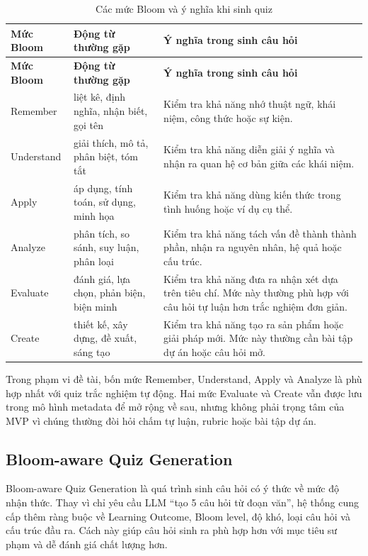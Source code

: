 \begin{longtable}{|p{2.6cm}|p{4.2cm}|p{7cm}|}
\caption{Các mức Bloom và ý nghĩa khi sinh quiz}
\label{tab:bloom-levels}\\
\hline
\textbf{Mức Bloom} & \textbf{Động từ thường gặp} & \textbf{Ý nghĩa trong sinh câu hỏi} \\
\hline
\endfirsthead
\hline
\textbf{Mức Bloom} & \textbf{Động từ thường gặp} & \textbf{Ý nghĩa trong sinh câu hỏi} \\
\hline
\endhead
Remember & liệt kê, định nghĩa, nhận biết, gọi tên & Kiểm tra khả năng nhớ thuật ngữ, khái niệm, công thức hoặc sự kiện. \\
\hline
Understand & giải thích, mô tả, phân biệt, tóm tắt & Kiểm tra khả năng diễn giải ý nghĩa và nhận ra quan hệ cơ bản giữa các khái niệm. \\
\hline
Apply & áp dụng, tính toán, sử dụng, minh họa & Kiểm tra khả năng dùng kiến thức trong tình huống hoặc ví dụ cụ thể. \\
\hline
Analyze & phân tích, so sánh, suy luận, phân loại & Kiểm tra khả năng tách vấn đề thành thành phần, nhận ra nguyên nhân, hệ quả hoặc cấu trúc. \\
\hline
Evaluate & đánh giá, lựa chọn, phản biện, biện minh & Kiểm tra khả năng đưa ra nhận xét dựa trên tiêu chí. Mức này thường phù hợp với câu hỏi tự luận hơn trắc nghiệm đơn giản. \\
\hline
Create & thiết kế, xây dựng, đề xuất, sáng tạo & Kiểm tra khả năng tạo ra sản phẩm hoặc giải pháp mới. Mức này thường cần bài tập dự án hoặc câu hỏi mở. \\
\hline
\end{longtable}

Trong phạm vi đề tài, bốn mức Remember, Understand, Apply và Analyze là phù
hợp nhất với quiz trắc nghiệm tự động. Hai mức Evaluate và Create vẫn được
lưu trong mô hình metadata để mở rộng về sau, nhưng không phải trọng tâm của
MVP vì chúng thường đòi hỏi chấm tự luận, rubric hoặc bài tập dự án.

\subsection{Bloom-aware Quiz Generation}
\label{subsec:bloom-aware-quiz-generation}

Bloom-aware Quiz Generation là quá trình sinh câu hỏi có ý thức về mức độ nhận
thức. Thay vì chỉ yêu cầu LLM ``tạo 5 câu hỏi từ đoạn văn'', hệ thống cung cấp
thêm ràng buộc về Learning Outcome, Bloom level, độ khó, loại câu hỏi và cấu
trúc đầu ra. Cách này giúp câu hỏi sinh ra phù hợp hơn với mục tiêu sư phạm và
dễ đánh giá chất lượng hơn.

